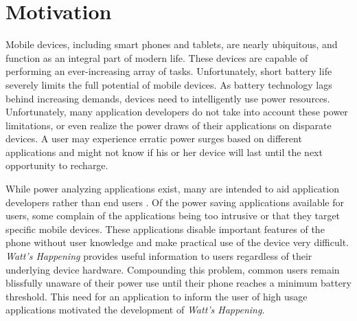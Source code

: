 \section{Motivation}
\label{sec:motivation}
Mobile devices, including smart phones and tablets, are nearly ubiquitous, and function as an integral part of modern life. 
These devices are capable of performing an ever-increasing array of tasks. 
Unfortunately, short battery life severely limits the full potential of mobile devices. 
As battery technology lags behind increasing demands, devices need to intelligently use power resources. 
Unfortunately, many application developers do not take into account these power limitations, or even realize the power draws of their applications on disparate devices. 
A user may experience erratic power surges based on different applications and might not know if his or her device will last until the next opportunity to recharge. 

While power analyzing applications exist, many are intended to aid application developers rather than end users \cite{Pathak:2012:ESI:2168836.2168841} \cite{energy-aware}. 
Of the power saving applications available for users, some complain of the applications being too intrusive or that they target specific mobile devices. 
These applications disable important features of the phone without user knowledge and make practical use of the device very difficult.
\emph{Watt's Happening} provides useful information to users regardless of their underlying device hardware.
Compounding this problem, common users remain blissfully unaware of their power use until their phone reaches a minimum battery threshold.
This need for an application to inform the user of high usage applications motivated the development of \emph{Watt's Happening}.

